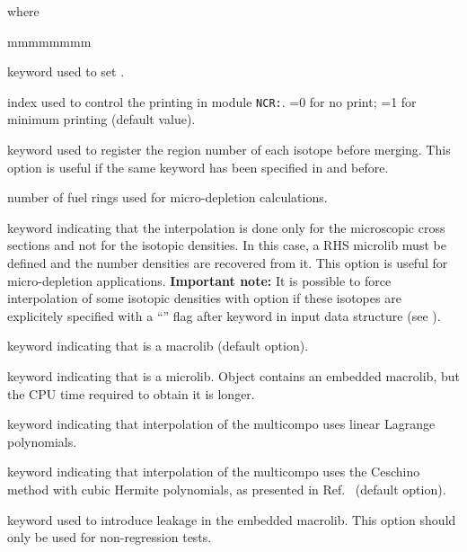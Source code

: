 \noindent where
\begin{ListeDeDescription}{mmmmmmmm}

\item[\moc{EDIT}] keyword used to set .

\item[\dusa{iprint}] index used to control the printing in module {\tt NCR:}. =0 for no print; =1 for minimum printing (default value).

\item[\moc{ALLX}] keyword used to register the region number of each isotope before merging. This option is useful if the same keyword has been specified in  and  before.

\item[\dusa{nbfuel}] number of fuel rings used for micro-depletion calculations.

\item[\moc{RES}] keyword indicating that the interpolation is done only for the microscopic cross sections and not for the isotopic densities. In this case, a RHS {\sc microlib} must be defined and the number densities are recovered from it. This option is useful for micro-depletion applications. {\bf Important note:} It is possible to force interpolation of some isotopic densities with  option if these
isotopes are explicitely specified with a ``\moc{*}'' flag after  keyword in  input data structure (see ).

\item[\moc{MACRO}] keyword indicating that  is a {\sc macrolib} (default option).

\item[\moc{MICRO}] keyword indicating that  is a {\sc microlib}. Object  contains an embedded {\sc macrolib}, but the CPU time required to obtain it is longer.

\item[\moc{LINEAR}] keyword indicating that interpolation of the {\sc multicompo} uses linear Lagrange
polynomials.

\item[\moc{CUBIC}] keyword indicating that interpolation of the {\sc multicompo} uses the Ceschino method
with cubic Hermite polynomials, as presented in Ref.~ (default option).

\item[\moc{LEAK}] keyword used to introduce leakage in the embedded {\sc macrolib}. This option should only be used for non-regression tests.


\end{ListeDeDescription}

